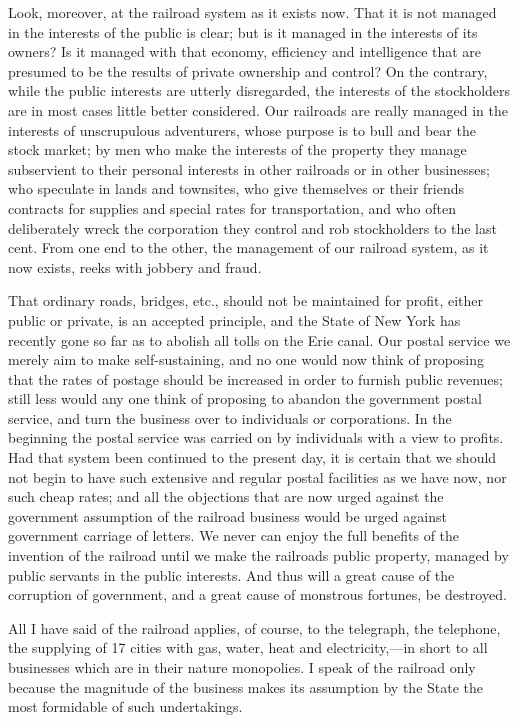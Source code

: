 \documentclass{book}
\begin{document}
Look, moreover, at the railroad system as it exists now. That it is not managed in the interests of the public is clear; but is it managed in the interests of its owners? Is it managed with that economy, efficiency and intelligence that are presumed to be the results of private ownership and control? On the contrary, while the public interests are utterly disregarded, the interests of the stockholders are in most cases little better considered. Our railroads are really managed in the interests of unscrupulous adventurers, whose purpose is to bull and bear the stock market; by men who make the interests of the property they manage subservient to their personal interests in other railroads or in other businesses; who speculate in lands and townsites, who give themselves or their friends contracts for supplies and special rates for transportation, and who often deliberately wreck the corporation they control and rob stockholders to the last cent. From one end to the other, the management of our railroad system, as it now exists, reeks with jobbery and fraud.

That ordinary roads, bridges, etc., should not be maintained for profit, either public or private, is an accepted principle, and the State of New York has recently gone so far as to abolish all tolls on the Erie canal. Our postal service we merely aim to make self-sustaining, and no one would now think of proposing that the rates of postage should be increased in order to furnish public revenues; still less would any one think of proposing to abandon the government postal service, and turn the business over to individuals or corporations. In the beginning the postal service was carried on by individuals with a view to profits. Had that system been continued to the present day, it is certain that we should not begin to have such extensive and regular postal facilities as we have now, nor such cheap rates; and all the objections that are now urged against the government assumption of the railroad business would be urged against government carriage of letters. We never can enjoy the full benefits of the invention of the railroad until we make the railroads public property, managed by public servants in the public interests. And thus will a great cause of the corruption of government, and a great cause of monstrous fortunes, be destroyed.

All I have said of the railroad applies, of course, to the telegraph, the telephone, the supplying of 17 cities with gas, water, heat and electricity,—in short to all businesses which are in their nature monopolies. I speak of the railroad only because the magnitude of the business makes its assumption by the State the most formidable of such undertakings.
\end{document}
